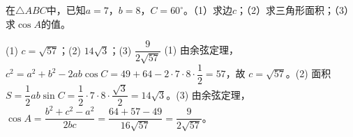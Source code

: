 \begin{question}[GPT生成]
在$\triangle ABC$中，已知$a=7$，$b=8$，$C=60^\circ$。（1）求边$c$；（2）求三角形面积；（3）求$\cos A$的值。
\end{question}
\solutionSpace{5cm}
\begin{answer}{(1) $c=\sqrt{57}$；(2) $14\sqrt3$；(3) $\dfrac{9}{2\sqrt{57}}$}
(1) 由余弦定理，$c^2=a^2+b^2-2ab\cos C=49+64-2\cdot7\cdot8\cdot\dfrac12=57$，故 $c=\sqrt{57}$。(2) 面积 $S=\dfrac12ab\sin C=\dfrac12\cdot7\cdot8\cdot\dfrac{\sqrt3}{2}=14\sqrt3$。(3) 由余弦定理，$\cos A=\dfrac{b^2+c^2-a^2}{2bc}=\dfrac{64+57-49}{16\sqrt{57}}=\dfrac{9}{2\sqrt{57}}$。
\end{answer}

\printChapterAnswers
